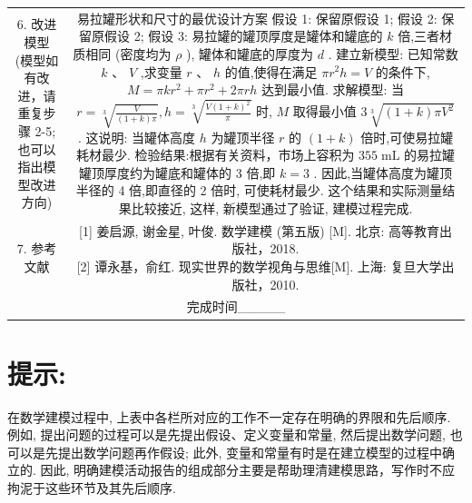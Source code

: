 \documentclass[10pt]{article}
\begin{document}
\begin{center}
{\begin{tabular}{|c|c|}
6. 改进模型 (模型如有改进，请重复步骤 2-5; 也可以指出模型改进方向) & \makecell{ 易拉罐形状和尺寸的最优设计方案 \\ 假设 1: 保留原假设 1; \\ 假设 2: 保留原假设 2; \\ 假设 3: 易拉罐的罐顶厚度是罐体和罐底的 \(k\) 倍,三者材质相同 (密度均为 \(\rho\) ), 罐体和罐底的厚度为 \(d\) . \\ 建立新模型: 已知常数 \(k\text{ 、 }V\) ,求变量 \(r\text{ 、 }h\) 的值,使得在满足 \(\pi {r}^{2}h = V\) 的条件下, \(M = {\pi k}{r}^{2} + \pi {r}^{2} + {2\pi rh}\) 达到最小值. \\ 求解模型: 当 \(r = \sqrt[3]{\frac{V}{\left( {1 + k}\right) \pi }},h = \sqrt[3]{\frac{V{\left( 1 + k\right) }^{2}}{\pi }}\) 时, \(M\) 取得最小值 \(3\sqrt[3]{\left( {1 + k}\right) \pi {V}^{2}}\) . 这说明: 当罐体高度 \(h\) 为罐顶半径 \(r\) 的 \(\left( {1 + k}\right)\) 倍时,可使易拉罐耗材最少. \\ 检验结果:根据有关资料，市场上容积为 \({355}\mathrm{\;{mL}}\) 的易拉罐罐顶厚度约为罐底和罐体的 3 倍,即 \(k = 3\) . 因此,当罐体高度为罐顶半径的 4 倍,即直径的 2 倍时, 可使耗材最少. 这个结果和实际测量结果比较接近, 这样, 新模型通过了验证, 建模过程完成. } \\
\cline{1-2}
7. 参考文献 & \makecell{ [1] 姜启源, 谢金星, 叶俊. 数学建模 (第五版) [M]. 北京: 高等教育出版社，2018. \\ {[2] 谭永基，俞红. 现实世界的数学视角与思维[M]. 上海: 复旦大学出版社，2010.} } \\
\cline{1-2}
\multicolumn{2}{|c|}{完成时间\_\_\_\_\_} \\
\cline{1-2}
\hline
\end{tabular}
}
\end{center}

\section*{提示:}

在数学建模过程中, 上表中各栏所对应的工作不一定存在明确的界限和先后顺序. 例如, 提出问题的过程可以是先提出假设、定义变量和常量, 然后提出数学问题, 也可以是先提出数学问题再作假设; 此外, 变量和常量有时是在建立模型的过程中确立的. 因此, 明确建模活动报告的组成部分主要是帮助理清建模思路，写作时不应拘泥于这些环节及其先后顺序.

\section*{}
\end{document}
